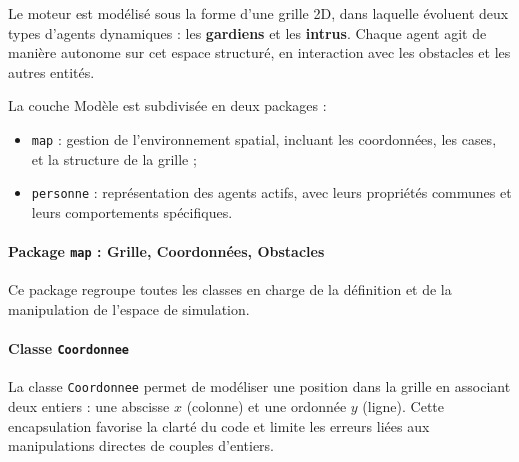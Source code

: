 Le moteur est modélisé sous la forme d’une grille 2D, dans laquelle évoluent deux types d'agents dynamiques : les \textbf{gardiens} et les \textbf{intrus}. Chaque agent agit de manière autonome sur cet espace structuré, en interaction avec les obstacles et les autres entités.

La couche Modèle est subdivisée en deux packages :
\begin{itemize}
    \item \texttt{map} : gestion de l’environnement spatial, incluant les coordonnées, les cases, et la structure de la grille ;
    \item \texttt{personne} : représentation des agents actifs, avec leurs propriétés communes et leurs comportements spécifiques.
\end{itemize}
\paragraph{Package \texttt{map} : Grille, Coordonnées, Obstacles }


Ce package regroupe toutes les classes en charge de la définition et de la manipulation de l’espace de simulation.

\paragraph{Classe \texttt{Coordonnee}}

La classe \texttt{Coordonnee} permet de modéliser une position dans la grille en associant deux entiers : une abscisse $x$ (colonne) et une ordonnée $y$ (ligne). Cette encapsulation favorise la clarté du code et limite les erreurs liées aux manipulations directes de couples d’entiers.

